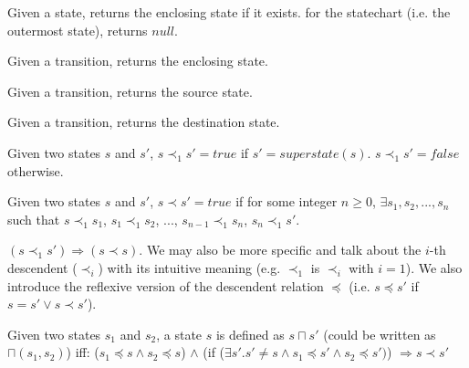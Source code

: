 \documentclass[12pt,a4paper]{report}
\begin{document}
\begin{definition} \label{d:ss}
	Given a state, returns the enclosing state if it exists. for the statechart (i.e. the outermost state), returns $null$.
\end{definition}

\begin{definition} \label{d:s}
	Given a transition, returns the enclosing state.
\end{definition}

\begin{definition} \label{d:src}
	Given a transition, returns the source state.
\end{definition}

\begin{definition} \label{d:dest}
	Given a transition, returns the destination state.
\end{definition}

\begin{definition} \label{d:cs}
	Given two states $s$ and $s'$, $s \prec_1 s' = true$ if $s' = superstate(s)$. $s \prec_1 s' = false$ otherwise.
\end{definition}

\begin{definition} \label{d:desc}
	Given two states $s$ and $s'$, $s \prec s' = true$ if for some integer $n \geq 0$, $\exists s_1, s_2, ..., s_n$ such that $s \prec_1 s_1$, $s_1 \prec_1 s_2$, ..., $s_{n - 1} \prec_1 s_n$, $s_n \prec_1 s'$.
\end{definition}

$(s \prec_1 s') \Rightarrow (s \prec s)$. We may also be more specific and talk about the $i$-th descendent ($\prec_i$) with its intuitive meaning (e.g. $\prec_1$ is $\prec_i$ with $i = 1$). We also introduce the reflexive version of the descendent relation $\preceq$ (i.e. $s \preceq s'$ if $s = s' \lor s \prec s'$).


\begin{definition} \label{d:lub}
	Given two states $s_1$ and $s_2$, a state $s$ is defined as $s \sqcap s'$ (could be written as $\sqcap(s_1, s_2)$) iff: ($s_1 \preceq s \wedge s_2 \preceq s$) $\wedge$ (if ($\exists s' . s' \neq s \wedge s_1 \preceq s' \wedge s_2 \preceq s')$) $\Rightarrow s \prec s'$ 
\end{definition}
\end{document}
